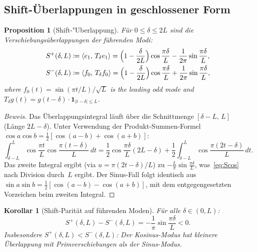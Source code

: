 \documentclass[12pt,a4paper]{article}
\newtheorem{proposition}[theorem]{Proposition}
\newtheorem{corollary}[theorem]{Korollar}
\theoremstyle{definition}
\theoremstyle{remark}
\begin{document}
\subsection{Shift-\"Uberlappungen in geschlossener Form}

\begin{proposition}[Shift-"Uberlappung]
\label{prop:overlap-closed}
Für $0 \leq \delta \leq 2L$ sind die Verschiebungsüberlappungen der führenden Modi:
\begin{align}
  S^+(\delta, L) &\coloneqq \langle e_1,\, T_\delta e_1\rangle = \Bigl(1 - \frac{\delta}{2L}\Bigr)\cos\frac{\pi\delta}{L} - \frac{1}{2\pi}\sin\frac{\pi\delta}{L}, \label{eq:Scos} \\
  S^-(\delta, L) &\coloneqq \langle f_0,\, T_\delta f_0\rangle = \Bigl(1 - \frac{\delta}{2L}\Bigr)\cos\frac{\pi\delta}{L} + \frac{1}{2\pi}\sin\frac{\pi\delta}{L}, \label{eq:Ssin}
\end{align}
where $f_0(t) = \sin(\pi t/L)/\sqrt{L}$ is the leading odd mode and $T_\delta g(t) = g(t - \delta)\cdot\mathbf{1}_{|t-\delta|\leq L}$.
\end{proposition}

\begin{proof}[Beweis]
Das Überlappungsintegral läuft über die Schnittmenge $[\delta - L,\,L]$ (Länge $2L - \delta$). Unter Verwendung der Produkt-Summen-Formel $\cos a\cos b = \tfrac{1}{2}[\cos(a-b) + \cos(a+b)]$:
\[
  \int_{\delta-L}^{L} \cos\frac{\pi t}{L}\cos\frac{\pi(t-\delta)}{L}\,dt
  = \frac{1}{2}\cos\frac{\pi\delta}{L}(2L - \delta) + \frac{1}{2}\int_{\delta-L}^{L}\cos\frac{\pi(2t-\delta)}{L}\,dt.
\]
Das zweite Integral ergibt (via $u = \pi(2t-\delta)/L$) zu $-\frac{L}{\pi}\sin\frac{\pi\delta}{L}$, was~\eqref{eq:Scos} nach Division durch~$L$ ergibt. Der Sinus-Fall folgt identisch aus $\sin a\sin b = \tfrac{1}{2}[\cos(a-b) - \cos(a+b)]$, mit dem entgegengesetzten Vorzeichen beim zweiten Integral.
\end{proof}

\begin{corollary}[Shift-Parität auf führenden Moden]
\label{cor:diagonal-parity}
Für alle $\delta \in (0, L)$:
\begin{equation}
\label{eq:parity-diff}
  S^+(\delta, L) - S^-(\delta, L) = -\frac{1}{\pi}\sin\frac{\pi\delta}{L} < 0.
\end{equation}
Insbesondere $S^+(\delta, L) < S^-(\delta, L)$: Der Kosinus-Modus hat \emph{kleinere} Überlappung mit Primverschiebungen als der Sinus-Modus.
\end{corollary}
\end{document}
